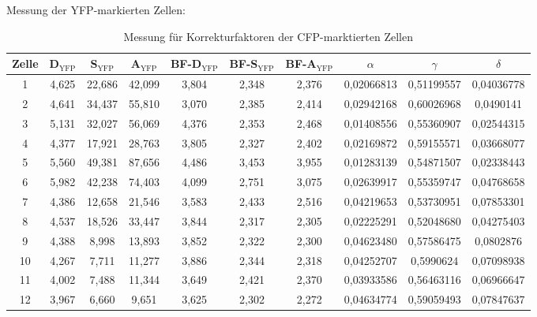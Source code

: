   Messung der YFP-markierten Zellen:
\begin{table}[htbp]
    \centering
      \begin{tabular}{c|ccccccccc}
        Zelle & D$_\text{YFP}$ & S$_\text{YFP}$ & A$_\text{YFP}$ & BF-D$_\text{YFP}$ & BF-S$_\text{YFP}$ & BF-A$_\text{YFP}$ & $\alpha$ & $\gamma$ & $\delta$\\\hline
      1 & 4,625 & 22,686 & 42,099 & 3,804 & 2,348 & 2,376 & 0,02066813 & 0,51199557 & 0,04036778 \\
      2 & 4,641 & 34,437 & 55,810 & 3,070 & 2,385 & 2,414 & 0,02942168 & 0,60026968 & 0,0490141 \\
      3 & 5,131 & 32,027 & 56,069 & 4,376 & 2,353 & 2,468 & 0,01408556 & 0,55360907 & 0,02544315 \\
      4 & 4,377 & 17,921 & 28,763 & 3,805 & 2,327 & 2,402 & 0,02169872 & 0,59155571 & 0,03668077 \\
      5 & 5,560 & 49,381 & 87,656 & 4,486 & 3,453 & 3,955 & 0,01283139 & 0,54871507 & 0,02338443 \\
      6 & 5,982 & 42,238 & 74,403 & 4,099 & 2,751 & 3,075 & 0,02639917 & 0,55359747 & 0,04768658 \\
      7 & 4,386 & 12,658 & 21,546 & 3,583 & 2,433 & 2,516 & 0,04219653 & 0,53730951 & 0,07853301 \\
      8 & 4,537 & 18,526 & 33,447 & 3,844 & 2,317 & 2,305 & 0,02225291 & 0,52048680 & 0,04275403 \\
      9 & 4,388 & 8,998 & 13,893 & 3,852 & 2,322 & 2,300 & 0,04623480 & 0,57586475 & 0,0802876 \\
      10 & 4,267 & 7,711 & 11,277 & 3,886 & 2,344 & 2,318 & 0,04252707 & 0,5990624 & 0,07098938 \\
      11 & 4,002 & 7,488 & 11,344 & 3,649 & 2,421 & 2,370 & 0,03933586 & 0,56463116 & 0,06966647 \\
      12 & 3,967 & 6,660 & 9,651 & 3,625 & 2,302 & 2,272 & 0,04634774 & 0,59059493 & 0,07847637
      \end{tabular}
    \caption{Messung für Korrekturfaktoren der CFP-marktierten Zellen}
  \end{table}

